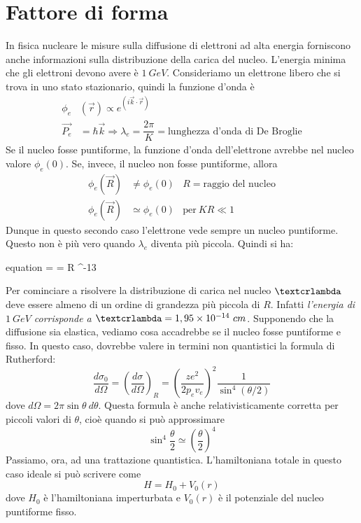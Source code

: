 \chapter{Fattore di forma}
In fisica nucleare  le misure sulla diffusione di
elettroni ad alta energia forniscono anche informazioni sulla distribuzione
della carica del nucleo. L'energia minima che gli elettroni devono avere è $1 \
GeV$. Consideriamo un elettrone libero che si trova in uno stato stazionario,
quindi la funzione d'onda è
\begin{align}
\phi _{e} &(\vec{r}) \propto e^{(i\vec{k} \cdot \vec{r})} \\
\vec{P_{e}} &= \hbar \vec{k} \Rightarrow \lambda _{e} = \dfrac{2\pi}{K} = \text{lunghezza d'onda di De Broglie}
\end{align} 
Se il nucleo fosse puntiforme, la funzione d'onda dell'elettrone avrebbe nel
nucleo valore $\phi _{e} (0)$. Se, invece, il nucleo non fosse puntiforme,
allora
\begin{align}
\phi _{e} (\vec{R}) & \neq \phi _{e}(0)  & R = \text{raggio del nucleo} \\
\phi _{e} (\vec{R}) & \simeq \phi _{e}(0) & \text{per} \ KR \ll 1
\end{align}
Dunque in questo secondo caso l'elettrone vede sempre un nucleo puntiforme.
Questo non è più vero quando $\lambda _{e}$ diventa più piccola. Quindi si ha:
\begin{empheq} [box=%
\fbox]{equation}
\text{\textcrlambda} =  =  \gg R \simeq
10^{-13} \ \text{cm} \Rightarrow \text{nucleo puntiforme}
\end{empheq}
Per cominciare a risolvere la distribuzione di carica nel nucleo
$\text{\textcrlambda}$ deve essere almeno di un ordine di grandezza più piccola
di $R$. Infatti \textit{l'energia di $1 \ GeV$ corrisponde a
  $\text{\textcrlambda} = 1,95 \times 10^{-14} \ cm$}. Supponendo che la
  diffusione sia elastica, vediamo cosa accadrebbe se il nucleo fosse puntiforme
  e fisso. In questo caso, dovrebbe valere in termini non quantistici la formula
  di Rutherford:
\begin{equation}
\dfrac{d\sigma _0}{d\Omega} = \left(\dfrac{d\sigma}{d\Omega}\right) _R = \left( \dfrac{ze^2}{2p_ev_e} \right) ^2 \dfrac{1}{\sin ^{4}(\theta /2)} 
\end{equation}
dove $d\Omega = 2 \pi \sin \theta \ d\theta$.
Questa formula è anche relativisticamente corretta per piccoli valori di
$\theta$, cioè quando si può approssimare
\begin{equation}
\sin ^{4} \dfrac{\theta}{2} \simeq \left(\dfrac{\theta}{2}\right)^{4}
\end{equation}
Passiamo, ora, ad una trattazione quantistica. L'hamiltoniana totale in questo
caso ideale si può scrivere come
\begin{equation}
H = H_{0} + V_{0}(r)
\end{equation}
dove $H_{0}$ è l'hamiltoniana imperturbata e $V_{0}(r)$ è il potenziale del
nucleo puntiforme fisso.

